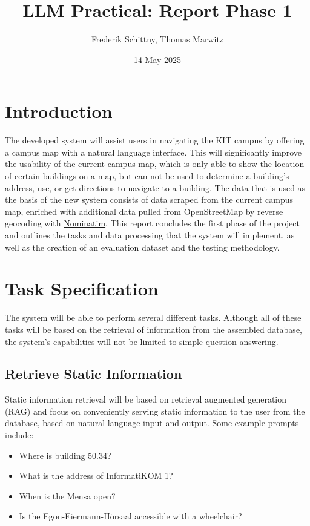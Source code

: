 \documentclass{article}
\title{LLM Practical: Report Phase 1}
\author{Frederik Schittny, Thomas Marwitz}
\date{14 May 2025}
\begin{document}
\maketitle

\section{Introduction}
The developed system will assist users in navigating the KIT campus by offering a campus map with a natural language interface. This will significantly improve the usability of the \href{https://www.kit.edu/campusplan/index_en.php}{current campus map}, which is only able to show the location of certain buildings on a map, but can not be used to determine a building's address, use, or get directions to navigate to a building. The data that is used as the basis of the new system consists of data scraped from the current campus map, enriched with additional data pulled from OpenStreetMap by reverse geocoding with \href{https://nominatim.org/release-docs/latest/api/Reverse/}{Nominatim}. This report concludes the first phase of the project and outlines the tasks and data processing that the system will implement, as well as the creation of an evaluation dataset and the testing methodology.

\section{Task Specification} \label{sec:tasks}
The system will be able to perform several different tasks. Although all of these tasks will be based on the retrieval of information from the assembled database, the system's capabilities will not be limited to simple question answering.

\subsection{Retrieve Static Information} \label{sec:stat_info}
Static information retrieval will be based on retrieval augmented generation (RAG) and focus on conveniently serving static information to the user from the database, based on natural language input and output. Some example prompts include:
  \begin{itemize}
      \item Where is building 50.34?
      \item What is the address of InformatiKOM 1?
      \item When is the Mensa open?
      \item Is the Egon-Eiermann-Hörsaal accessible with a wheelchair?
  \end{itemize}
\end{document}
